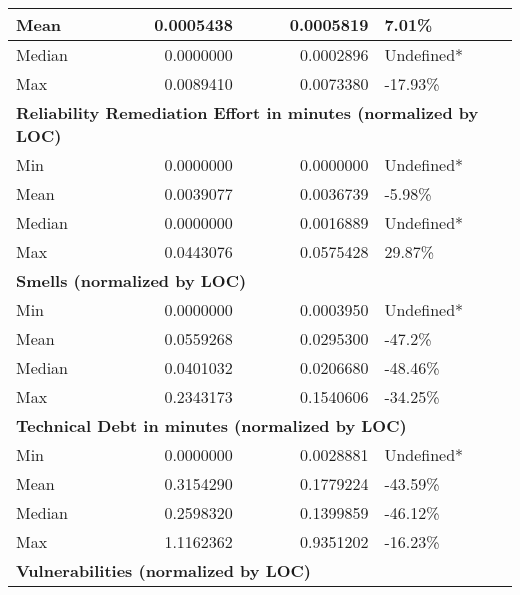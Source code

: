 \begin{table}
\begin{tabular}[t]{l|r|r|l}
\hline
\hspace{1em}Mean & 0.0005438 & 0.0005819 & 7.01\%\\
\hline
\hspace{1em}Median & 0.0000000 & 0.0002896 & Undefined*\\
\hline
\hspace{1em}Max & 0.0089410 & 0.0073380 & -17.93\%\\
\hline
\multicolumn{4}{l}{\textbf{Reliability Remediation Effort in minutes (normalized by LOC)}}\\
\hline
\hspace{1em}Min & 0.0000000 & 0.0000000 & \vphantom{1} Undefined*\\
\hline
\hspace{1em}Mean & 0.0039077 & 0.0036739 & -5.98\%\\
\hline
\hspace{1em}Median & 0.0000000 & 0.0016889 & Undefined*\\
\hline
\hspace{1em}Max & 0.0443076 & 0.0575428 & 29.87\%\\
\hline
\multicolumn{4}{l}{\textbf{Smells (normalized by LOC)}}\\
\hline
\hspace{1em}Min & 0.0000000 & 0.0003950 & Undefined*\\
\hline
\hspace{1em}Mean & 0.0559268 & 0.0295300 & -47.2\%\\
\hline
\hspace{1em}Median & 0.0401032 & 0.0206680 & -48.46\%\\
\hline
\hspace{1em}Max & 0.2343173 & 0.1540606 & -34.25\%\\
\hline
\multicolumn{4}{l}{\textbf{Technical Debt in minutes (normalized by LOC)}}\\
\hline
\hspace{1em}Min & 0.0000000 & 0.0028881 & Undefined*\\
\hline
\hspace{1em}Mean & 0.3154290 & 0.1779224 & -43.59\%\\
\hline
\hspace{1em}Median & 0.2598320 & 0.1399859 & -46.12\%\\
\hline
\hspace{1em}Max & 1.1162362 & 0.9351202 & -16.23\%\\
\hline
\multicolumn{4}{l}{\textbf{Vulnerabilities (normalized by LOC)}}\\

\end{tabular}
\end{table}
